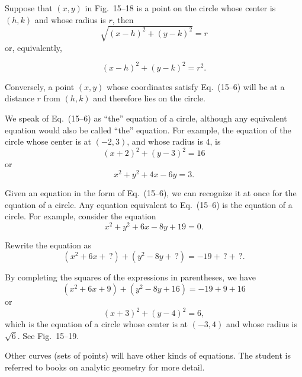 \documentclass[11pt]{book}
\theoremstyle{bkplain}
\begin{document}
\FIGXVEIGHTEENNINETEEN

Suppose that $(x, y)$ in Fig.~15--18 is a point on the circle whose center is
$(h, k)$ and whose radius is $r$, then
\[
\sqrt{(x-h)^2 + (y-k)^2} = r
\]
or, equivalently,

\begin{equation}\tag{15--6}
(x-h)^2 + (y-k)^2 = r^2.
\end{equation}

Conversely, a point $(x, y)$ whose coordinates satisfy Eq.~(15--6) will be at
a distance $r$ from $(h, k)$ and therefore lies on the circle.

We speak of Eq.~(15--6) as ``the'' equation of a circle, although any
equivalent equation would also be called ``the'' equation. For example, the
equation of the circle whose center is at $(-2, 3)$, and whose radius is 4, is
\[
(x + 2)^2 + (y - 3)^2 = 16
\]
or
\[
x^2 + y^2 + 4x - 6y = 3.
\]

Given an equation in the form of Eq.~(15--6), we can recognize it at once for
the equation of a circle. Any equation equivalent to Eq.~(15--6) is the
equation of a circle. For example, consider the equation
\[
x^2 + y^2 + 6x - 8y + 19 = 0.
\]

Rewrite the equation as
\[
(x^2 + 6x + \,?) + (y^2 - 8y + \,?) = -19 + \,? + \,?.
\]

By completing the squares of the expressions in parentheses, we have
\[
(x^2 + 6x + 9) + (y^2 - 8y + 16) = -19 + 9 + 16
\]
or
\[
(x + 3)^2 + (y - 4)^2 = 6,
\]
which is the equation of a circle whose center is at $(-3, 4)$ and whose
radius is $\sqrt{6}$. See Fig.~15--19.

Other curves (sets of points) will have other kinds of equations. The student
is referred to books on analytic geometry for more detail.
\end{document}
